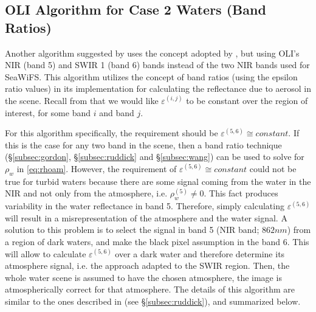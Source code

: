 \subsection{OLI Algorithm for Case 2 Waters (Band Ratios)}
Another algorithm suggested by \cite{GeraceThesis} uses the concept adopted by \cite{Ruddick:2000bs}, but using OLI's NIR (band 5) and SWIR 1 (band 6) bands instead of the two NIR bands used for SeaWiFS. This algorithm utilizes the concept of band ratios (using the epsilon ratio values) in its implementation for calculating the reflectance due to aerosol in the scene. Recall from \cite{Ruddick:2000bs} that we would like $\varepsilon^{(i,j)}$ to be constant over the region of interest, for some band $i$ and band $j$. 

For this algorithm specifically, the requirement should be $\varepsilon^{(5,6)}\cong constant$. If this is the case for any two band in the scene, then a band ratio technique (\S\ref{subsec:gordon}, \S\ref{subsec:ruddick} and \S\ref{subsec:wang}) can be used to solve for $\rho_w$ in \autoref{eq:rhoam}. However, the requirement of $\varepsilon^{(5,6)}\cong constant$ could not be true for turbid waters because there are some signal coming from the water in the NIR and not only from the atmosphere, i.e. $\rho_w^{(5)}\neq0$. This fact produces variability in the water reflectance in band 5. Therefore, simply calculating $\varepsilon^{(5,6)}$ will result in a misrepresentation of the atmosphere and the water signal. A solution to this problem is to select the signal in band 5 (NIR band; $862nm$) from a region of dark waters, and make the black pixel assumption in the band 6. This will allow to calculate $\varepsilon^{(5,6)}$ over a dark water and therefore determine its atmosphere signal, i.e. the \cite{Ruddick:2000bs} approach adapted to the SWIR region. Then, the whole water scene is assumed to have the chosen atmosphere, the image is atmospherically correct for that atmosphere. The details of this algorithm are similar to the ones described in \cite{Ruddick:2000bs} (see \S\ref{subsec:ruddick}), and summarized below.

